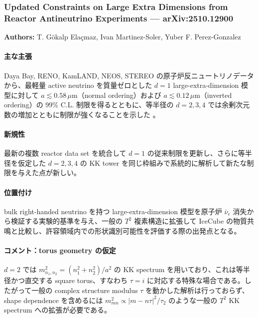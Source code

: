 \subsubsection{Updated Constraints on Large Extra Dimensions from Reactor Antineutrino Experiments --- arXiv:2510.12900}

\textbf{Authors:} T. G\"okalp Ela\c{c}maz, Ivan Martinez-Soler, Yuber F. Perez-Gonzalez

\paragraph{主な主張}
Daya Bay, RENO, KamLAND, NEOS, STEREO の原子炉反ニュートリノデータから、最軽量 active neutrino を質量ゼロとした $d=1$ large-extra-dimension 模型に対して $a\lesssim0.58\,\mu\mathrm{m}$（normal ordering）および $a\lesssim0.12\,\mu\mathrm{m}$（inverted ordering）の 99\% C.L. 制限を得るとともに、等半径の $d=2,3,4$ では余剰次元数の増加とともに制限が強くなることを示した \cite{Elacmaz:2025LED}。

\paragraph{新規性}
最新の複数 reactor data set を統合して $d=1$ の従来制限を更新し、さらに等半径を仮定した $d=2,3,4$ の KK tower を同じ枠組みで系統的に解析して新たな制限を与えた点が新しい。

\paragraph{位置付け}
bulk right-handed neutrino を持つ large-extra-dimension 模型を原子炉 $\bar\nu_e$ 消失から検証する実験的基準を与え、一般の $T^2$ 複素構造に拡張して IceCube の物質共鳴と比較し、許容領域内での形状識別可能性を評価する際の出発点となる。

\paragraph{コメント：torus geometry の仮定}
$d=2$ では $m_{n_1,n_2}^2=(n_1^2+n_2^2)/a^2$ の KK spectrum を用いており、これは等半径かつ直交する square torus、すなわち $\tau=i$ に対応する特殊な場合である。したがって一般の complex structure modulus $\tau$ を動かした解析は行っておらず、shape dependence を含めるには $m_{mn}^2\propto |m-n\tau|^2/\tau_2$ のような一般の $T^2$ KK spectrum への拡張が必要である。
